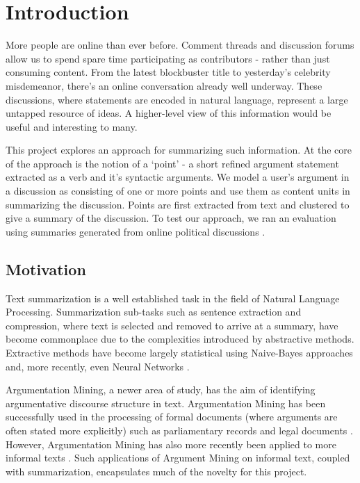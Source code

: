 \chapter{Introduction\label{chap:introduction}}
  More people are online than ever before. Comment threads and discussion forums allow us to spend spare time participating as contributors - rather than just consuming content. From the latest blockbuster title to yesterday's celebrity misdemeanor, there's an online conversation already well underway. These discussions, where statements are encoded in natural language, represent a large untapped resource of ideas. A higher-level view of this information would be useful and interesting to many.

  This project explores an approach for summarizing such information. At the core of the approach is the notion of a `point' - a short refined argument statement extracted as a verb and it's syntactic arguments. We model a user's argument in a discussion as consisting of one or more points and use them as content units in summarizing the discussion. Points are first extracted from text and clustered to give a summary of the discussion. To test our approach, we ran an evaluation using summaries generated from online political discussions \cite{walker2012corpus}.

  \section{Motivation}
    Text summarization is a well established task in the field of Natural Language Processing. Summarization sub-tasks such as sentence extraction and compression, where text is selected and removed to arrive at a summary, have become commonplace due to the complexities introduced by abstractive methods. Extractive methods have become largely statistical using Naive-Bayes \cite{kupiec1995trainable} approaches and, more recently, even Neural Networks \cite{svore2007enhancing}.

    Argumentation Mining, a newer area of study, has the aim of identifying argumentative discourse structure in text. Argumentation Mining has been successfully used in the processing of formal documents (where arguments are often stated more explicitly) such as parliamentary records \cite{palau2009argumentation} and legal documents \cite{montemagni2010semantic}. However, Argumentation Mining has also more recently been applied to more informal texts \cite{park2015conditional}. Such applications of Argument Mining on informal text, coupled with summarization, encapsulates much of the novelty for this project.

